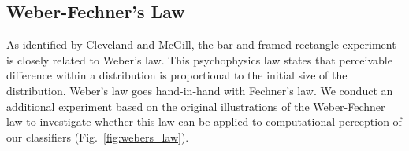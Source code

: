 \subsection{Weber-Fechner's Law}

As identified by Cleveland and McGill, the bar and framed rectangle experiment is closely related to Weber's law. This psychophysics law states that perceivable difference within a distribution is proportional to the initial size of the distribution. Weber's law goes hand-in-hand with Fechner's law. We conduct an additional experiment based on the original illustrations of the Weber-Fechner law to investigate whether this law can be applied to computational perception of our classifiers (Fig.~\ref{fig:webers_law}).

